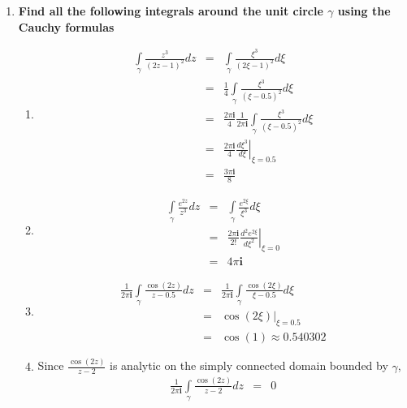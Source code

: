 \documentclass{article}%
\newcommand\I{\textbf{i}}
\newenvironment{proof}[1][]{\textbf{Proof #1} \\ }{\\ \rule{0.5em}{0.5em}  \\}
\begin{document}
\begin{enumerate}
\begin{enumerate}[label=\alph*)]
\begin{proof}[by induction]
\begin{eqnarray*}
            \end{eqnarray*}
        \end{proof}
    \end{enumerate}
    \item %
    \textbf{Find all the following integrals around the unit circle $\gamma$ using the Cauchy formulas}
    \begin{enumerate}[label=\alph*)]
        \item %
        \begin{eqnarray*}
            \int\limits_{\gamma} \frac{z^3}{(2z-1)^2} dz &=& \int\limits_{\gamma}{\frac{\xi^3}{(2\xi-1)^2} d\xi} \\
                &=& \frac{1}{4}\int\limits_{\gamma}{ \frac{\xi^3}{(\xi-0.5)^2} d\xi} \\
                &=& \frac{2\pi\I}{4} \frac{1}{2\pi\I} \int\limits_{\gamma}{ \frac{\xi^3}{(\xi-0.5)^2} d\xi} \\
                &=& \frac{2\pi\I}{4} \left. \frac{d \xi^3}{d\xi} \right|_{\xi=0.5} \\
                &=& \frac{3\pi\I}{8}
        \end{eqnarray*}
        \item %
        \begin{eqnarray*}
            \int\limits_{\gamma}{\frac{e^{2z}}{z^3}dz} &=& \int\limits_{\gamma}{\frac{e^{2\xi}}{\xi^3}d\xi}\\
                &=& \frac{2\pi\I}{2!} \left.\frac{d^2e^{2\xi}}{d\xi^2} \right|_{\xi=0} \\
                &=& 4\pi\I
        \end{eqnarray*}
        \item %
        \begin{eqnarray*}
            \frac{1}{2\pi\I} \int\limits_{\gamma}{\frac{\cos(2z)}{z-0.5}dz} &=& \frac{1}{2\pi\I} \int\limits_{\gamma}{\frac{\cos(2\xi)}{\xi-0.5}d\xi} \\
                &=& \left. \cos(2\xi) \right|_{\xi=0.5} \\
                &=& \cos(1) \approx 0.540302
        \end{eqnarray*}
        \item %
        Since $\frac{\cos(2z)}{z-2}$ is analytic on the simply connected domain bounded by $\gamma$,
        \begin{eqnarray*}
            \frac{1}{2\pi\I} \int\limits_{\gamma}{\frac{\cos(2z)}{z-2}dz} &=& 0\\
        \end{eqnarray*}

\end{enumerate}
\end{enumerate}
\end{document}
